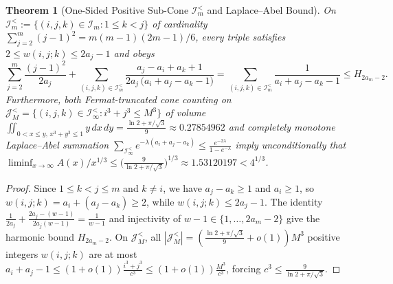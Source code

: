 \documentclass[11pt,a4paper]{article}
\newtheorem{theorem}{Theorem}[section]
\theoremstyle{remark}
\begin{document}
\begin{theorem}[One-Sided Positive Sub-Cone $\mathcal{I}_m^{<}$ and Laplace--Abel Bound]
On $\mathcal{I}_m^{<} := \{(i, j, k) \in \mathcal{I}_m : 1 \le k < j\}$ of cardinality $\sum_{j=2}^m (j-1)^2 = m(m-1)(2m-1)/6$, every triple satisfies $2 \le w(i, j; k) \le 2 a_j - 1$ and obeys
\[
  \sum_{j=2}^m \frac{(j - 1)^2}{2 a_j} + \sum_{(i,j,k) \in \mathcal{I}_m^{<}} \frac{a_j - a_i + a_k + 1}{2 a_j\,\bigl(a_i + a_j - a_k - 1\bigr)} = \sum_{(i,j,k) \in \mathcal{I}_m^{<}} \frac{1}{a_i + a_j - a_k - 1} \le H_{2 a_m - 2}.
\]
Furthermore, both Fermat-truncated cone counting on $\mathcal{J}_M^{<} = \{(i,j,k) \in \mathcal{I}_\infty^{<} : i^3 + j^3 \le M^3\}$ of volume $\iint_{0 < x \le y,\, x^3+y^3 \le 1} y\,dx\,dy = \frac{\ln 2 + \pi/\sqrt{3}}{9} \approx 0.27854962$ and completely monotone Laplace--Abel summation $\sum_{\mathcal{I}_\infty^{<}} e^{-\lambda(a_i + a_j - a_k)} \le \frac{e^{-2\lambda}}{1 - e^{-\lambda}}$ imply unconditionally that $\liminf_{x\to\infty} A(x)/x^{1/3} \le \bigl(\frac{9}{\ln 2 + \pi/\sqrt{3}}\bigr)^{1/3} \approx 1.53120197 < 4^{1/3}$.
\end{theorem}

\begin{proof}
Since $1 \le k < j \le m$ and $k \ne i$, we have $a_j - a_k \ge 1$ and $a_i \ge 1$, so $w(i, j; k) = a_i + (a_j - a_k) \ge 2$, while $w(i, j; k) \le 2 a_j - 1$. The identity $\frac{1}{2a_j} + \frac{2a_j - (w - 1)}{2a_j(w - 1)} = \frac{1}{w - 1}$ and injectivity of $w - 1 \in \{1, \dots, 2a_m - 2\}$ give the harmonic bound $H_{2a_m - 2}$. On $\mathcal{J}_M^{<}$, all $|\mathcal{J}_M^{<}| = (\frac{\ln 2 + \pi/\sqrt{3}}{9} + o(1))M^3$ positive integers $w(i, j; k)$ are at most $a_i + a_j - 1 \le (1 + o(1))\frac{i^3 + j^3}{c^3} \le (1 + o(1))\frac{M^3}{c^3}$, forcing $c^3 \le \frac{9}{\ln 2 + \pi/\sqrt{3}}$.
\end{proof}
\end{document}
